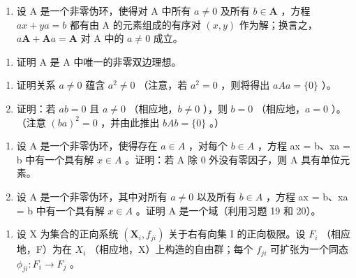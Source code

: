 \begin{enumerate}
\def\labelenumi{\arabic{enumi}.}
\setcounter{enumi}{18}
\tightlist
\item
  设 A 是一个非零伪环，使得对 A 中所有 \(a \neq 0\) 及所有 \(b \in \mathbf{A}\) ，方程 \(ax + ya = b\) 都有由 A 的元素组成的有序对 \((x, y)\) 作为解；换言之，\(a\mathbf{A} + \mathbf{A}a = \mathbf{A}\) 对 A 中的 \(a \neq 0\) 成立。
\end{enumerate}

\begin{enumerate}
\def\labelenumi{(\alph{enumi})}
\tightlist
\item
  证明 A 是 A 中唯一的非零双边理想。
\end{enumerate}

\begin{enumerate}
\def\labelenumi{(\alph{enumi})}
\setcounter{enumi}{1}
\item
  证明关系 \(a \neq 0\) 蕴含 \(a^2 \neq 0\) （注意，若 \(a^2 = 0\) ，则将得出 \(aAa = \{0\}\) ）。
\item
  证明：若 \(ab = 0\) 且 \(a \neq 0\) （相应地，\(b \neq 0\) ），则 \(b = 0\) （相应地，\(a = 0\) ）。（注意 \((ba)^2 = 0\) ，并由此推出 \(bAb = \{0\}\) 。）
\end{enumerate}

\begin{enumerate}
\def\labelenumi{\arabic{enumi}.}
\setcounter{enumi}{19}
\item
  设 A 是一个非零伪环，使得存在 \(a \in A\) ，对每个 \(b \in A\) ，方程 ax = b、xa = b 中有一个具有解 \(x \in A\) 。证明：若 A 除 0 外没有零因子，则 A 具有单位元素。
\item
  设 A 是一个非零伪环，其中对所有 \(a \neq 0\) 以及所有 \(b \in A\) ，方程 ax = b、xa = b 中有一个具有解 \(x \in A\) 。证明 A 是一个域（利用习题 19 和 20）。
\end{enumerate}

\BourbakiExercisesSection

\begin{enumerate}
\def\labelenumi{\arabic{enumi}.}
\tightlist
\item
  设 X 为集合的正向系统 \((\mathbf{X}_{i}, f_{ji})\) 关于右有向集 I 的正向极限。设 \(F_{i}\) （相应地，F）为在 \(X_{i}\) （相应地，X）上构造的自由群；每个 \(f_{ji}\) 可扩张为一个同态 \(\phi_{ji}: F_{i} \to F_{j}\) 。
\end{enumerate}

